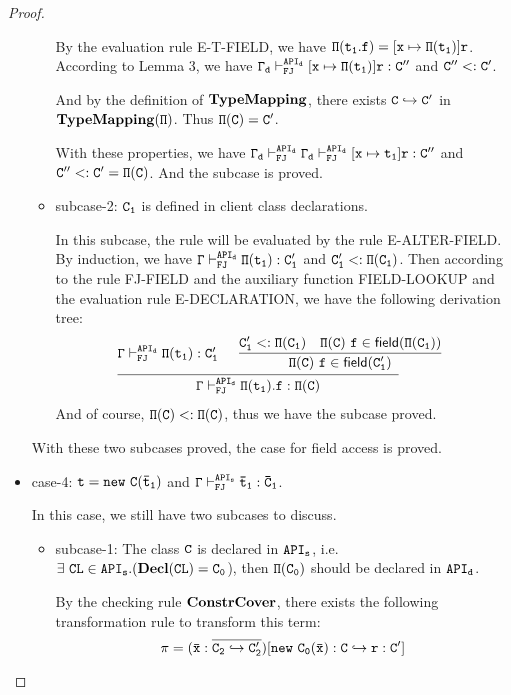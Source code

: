 \documentclass[letterpaper]{article}
\newcommand{\env}[2]{\vdash_{#1}^{#2}}
\begin{document}
\begin{proof}
\begin{itemize}
\begin{itemize}
      By the evaluation rule E-T-FIELD, we have $\tt \Pi(t_1.f)=[x\mapsto\Pi(t_1)]r$. According to Lemma 3, we have $\tt\Gamma_d\env{FJ}{API_d}[x\mapsto\Pi(t_1)]r:C''$ and $\tt C'' <: C'$. 

      And by the definition of $\tt \mathbf{TypeMapping}$, there exists $\tt C\hookrightarrow C'$ in $\tt \mathbf{TypeMapping}(\Pi)$. Thus $\tt \Pi(C)=C'$.

      With these properties, we have $\tt \Gamma_d\env{FJ}{API_d} \Gamma_d\env{FJ}{API_d}[x\mapsto t_1]r:C''$ and $\tt C'' <: C' =\Pi(C)$. And the subcase is proved.
    \item subcase-2: $\tt C_1$ is defined in client class declarations.

      In this subcase, the rule will be evaluated by the rule E-ALTER-FIELD. By induction, we have $\tt\Gamma\env{FJ}{API_d}\Pi(t_1):C'_1$ and $\tt C'_1 <:\Pi(C_1)$. Then according to the rule FJ-FIELD and the auxiliary function FIELD-LOOKUP and the evaluation rule E-DECLARATION, we have the following derivation tree:
      \[
          \begin{array}{c c}
          \infer
          {\tt \Gamma\env{FJ}{API_d} \Pi(t_1).f : \Pi(C)}
          {\tt \Gamma\env{FJ}{API_d} \Pi(t_1):C'_1
          & \begin{array}{c c}
              \infer 
              {\tt \Pi(C)~f\in\mathsf{field}(C'_1)}
              {\tt C'_1 <: \Pi(C_1)
              &\tt \Pi(C)~f\in\mathsf{field}(\Pi(C_1))}
            \end{array}
          }
          \end{array}
      \]
      And of course, $\tt \Pi(C)<:\Pi(C)$, thus we have the subcase proved.
  \end{itemize}
  With these two subcases proved, the case for field access is proved.

\item case-4: $\tt t=new~C(\bar{t}_1)$ and $\tt\Gamma\env{FJ}{API_s}\bar{t}_1:\bar{C}_1$.

In this case, we still have two subcases to discuss.
  \begin{itemize}
    \item subcase-1: The class $\tt C$ is declared in $\tt API_s$, i.e. $\tt\exists~CL\in API_s.(\mathbf{Decl}(CL)=C_0$), then $\tt \Pi(C_0)$ should be declared in $\tt API_d$.

    By the checking rule $\tt \mathbf{ConstrCover}$, there exists the following transformation rule to transform this term:
      $$\tt \pi=(\bar{x}:\overline{C_2 \hookrightarrow C'_2})[new~C_0(\bar{x}):C\hookrightarrow r:C']$$


\end{itemize}
\end{itemize}
\end{proof}
\end{document}

